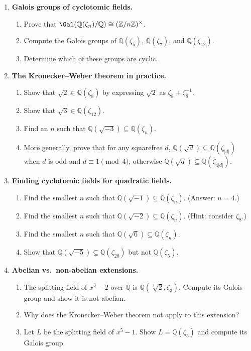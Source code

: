 \begin{enumerate}

    \item \textbf{Galois groups of cyclotomic fields.}
    \begin{enumerate}
        \item Prove that $\Gal(\mathbb{Q}(\zeta_n)/\mathbb{Q}) \cong (\mathbb{Z}/n\mathbb{Z})^\times$.
        \item Compute the Galois groups of $\mathbb{Q}(\zeta_5)$, $\mathbb{Q}(\zeta_7)$, and $\mathbb{Q}(\zeta_{12})$.
        \item Determine which of these groups are cyclic.
    \end{enumerate}

    \item \textbf{The Kronecker--Weber theorem in practice.}
    \begin{enumerate}
        \item Show that $\sqrt{2} \in \mathbb{Q}(\zeta_8)$ by expressing $\sqrt{2}$ as $\zeta_8 + \zeta_8^{-1}$.
        \item Show that $\sqrt{3} \in \mathbb{Q}(\zeta_{12})$.
        \item Find an $n$ such that $\mathbb{Q}(\sqrt{-3}) \subseteq \mathbb{Q}(\zeta_n)$.
        \item More generally, prove that for any squarefree $d$, $\mathbb{Q}(\sqrt{d}) \subseteq \mathbb{Q}(\zeta_{|d|})$ when $d$ is odd and $d \equiv 1 \pmod{4}$; otherwise $\mathbb{Q}(\sqrt{d}) \subseteq \mathbb{Q}(\zeta_{4|d|})$.
    \end{enumerate}

    \item \textbf{Finding cyclotomic fields for quadratic fields.}
    \begin{enumerate}
        \item Find the smallest $n$ such that $\mathbb{Q}(\sqrt{-1}) \subseteq \mathbb{Q}(\zeta_n)$. (Answer: $n=4$.)
        \item Find the smallest $n$ such that $\mathbb{Q}(\sqrt{-2}) \subseteq \mathbb{Q}(\zeta_n)$. (Hint: consider $\zeta_8$.)
        \item Find the smallest $n$ such that $\mathbb{Q}(\sqrt{6}) \subseteq \mathbb{Q}(\zeta_n)$.
        \item Show that $\mathbb{Q}(\sqrt{-5}) \subseteq \mathbb{Q}(\zeta_{20})$ but not $\mathbb{Q}(\zeta_5)$.
    \end{enumerate}

    \item \textbf{Abelian vs.\ non-abelian extensions.}
    \begin{enumerate}
        \item The splitting field of $x^3 - 2$ over $\mathbb{Q}$ is $\mathbb{Q}(\sqrt[3]{2}, \zeta_3)$. Compute its Galois group and show it is not abelian.
        \item Why does the Kronecker--Weber theorem not apply to this extension?
        \item Let $L$ be the splitting field of $x^5 - 1$. Show $L = \mathbb{Q}(\zeta_5)$ and compute its Galois group.
    \end{enumerate}


\end{enumerate}
